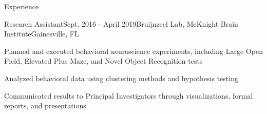 \documentclass{resume}
\begin{document}
\begin{rSection}{Experience}


\begin{rSubsection}{Research Assistant}{Sept. 2016 - April 2019}{Bruijnzeel Lab, McKnight Brain Institute}{Gainesville, FL}
     \item Planned and executed behavioral neuroscience experiments, including Large Open Field, Elevated Plus Maze, and Novel Object Recognition tests
     \item Analyzed behavioral data using clustering methods and hypothesis testing
     \item Communicated results to Principal Investigators through visualizations, formal reports, and presentations
     \end{rSubsection}
     
\end{rSection}
\end{document}
